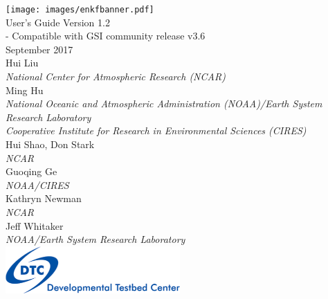 \begin{titlepage}
\vspace*{2.0cm}
\noindent
{}
   \begin{center}
      \texttt{[image: images/enkfbanner.pdf]}~\\[2em]
     {\color{darkcerulean}
         \Huge{User's Guide Version 1.2}\\[0.5em]
         \large{- Compatible with GSI community release v3.6}\\[1em]
         \normalsize{September 2017}\\[3em]
      } 
      \normalsize{Hui Liu}\\
      \textit{\small{National Center for Atmospheric Research (NCAR)}}\\[1em]
      \normalsize{Ming Hu}\\ 
      \textit{\small{National Oceanic and Atmospheric Administration (NOAA)/Earth System Research Laboratory}}\\
      \textit{\small{Cooperative Institute for Research in Environmental Sciences (CIRES)}}\\[1em]
      \normalsize{Hui Shao, Don Stark}\\
      \textit{\small{NCAR}}\\[1em]     
       \normalsize{Guoqing Ge}\\
      \textit{\small{NOAA/CIRES}}\\[1em]
      \normalsize{Kathryn Newman}\\
      \textit{\small{NCAR}}\\[1em]
      \normalsize{Jeff Whitaker}\\ 
      \textit{\small{NOAA/Earth System Research Laboratory}}\\[2em]

       \includegraphics[width=0.5\textwidth]{images/DTClogo.png}\\
  
       \vspace{1em}

   \end{center}
\end{titlepage}
\pagebreak{}




